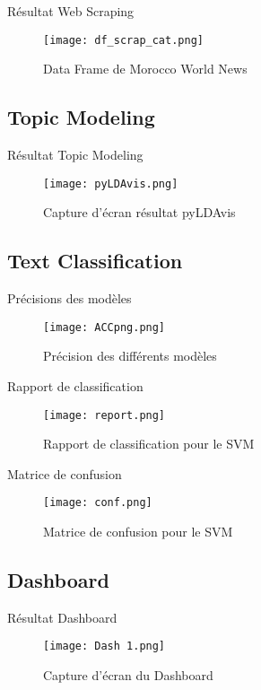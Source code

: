 \documentclass[10pt,sans,usenames,dvipsnames,english,compress]{beamer}
\begin{document}
\begin{frame}{Résultat Web Scraping}
    \begin{figure}[!h]
    \centering
    \texttt{[image: df\_scrap\_cat.png]}
    \caption{Data Frame de Morocco World News}
    \end{figure}
\end{frame}

\subsection{Topic Modeling}
\begin{frame}{Résultat Topic Modeling}
    \begin{figure}[!h]
    \centering
    \texttt{[image: pyLDAvis.png]}
    \caption{Capture d'écran résultat pyLDAvis}
    \end{figure}
\end{frame}

\subsection{Text Classification}
\begin{frame}{Précisions des modèles}
    \begin{figure}[!h]
    \centering
    \texttt{[image: ACCpng.png]}
    \caption{Précision des différents modèles}
    \end{figure}
\end{frame}

\begin{frame}{Rapport de classification}
    \begin{figure}[!h]
    \centering
    \texttt{[image: report.png]}
    \caption{Rapport de classification pour le SVM}
    \end{figure}
\end{frame}

\begin{frame}{Matrice de confusion}
    \begin{figure}[!h]
    \centering
    \texttt{[image: conf.png]}
    \caption{Matrice de confusion pour le SVM}
    \end{figure}
\end{frame}

\subsection{Dashboard}
\begin{frame}{Résultat Dashboard}
    \begin{figure}[!h]
    \centering
    \texttt{[image: Dash 1.png]}
    \caption{Capture d'écran du Dashboard}
    \end{figure}
\end{frame}
\end{document}
